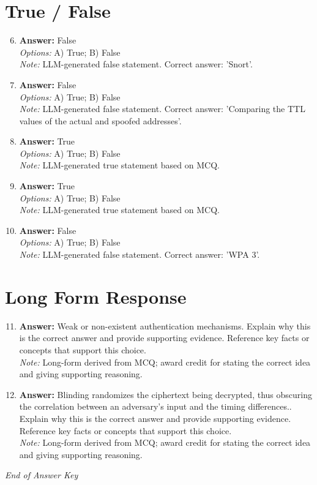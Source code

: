 \documentclass[12pt]{article}
\begin{document}
\section*{True / False}
\begin{enumerate}[label=\arabic*.]
\setcounter{enumi}{5}
\item \textbf{Answer:} False
\\ \textit{Options:} A) True; B) False
\\ \textit{Note:} LLM-generated false statement. Correct answer: 'Snort'.
\item \textbf{Answer:} False
\\ \textit{Options:} A) True; B) False
\\ \textit{Note:} LLM-generated false statement. Correct answer: 'Comparing the TTL values of the actual and spoofed addresses'.
\item \textbf{Answer:} True
\\ \textit{Options:} A) True; B) False
\\ \textit{Note:} LLM-generated true statement based on MCQ.
\item \textbf{Answer:} True
\\ \textit{Options:} A) True; B) False
\\ \textit{Note:} LLM-generated true statement based on MCQ.
\item \textbf{Answer:} False
\\ \textit{Options:} A) True; B) False
\\ \textit{Note:} LLM-generated false statement. Correct answer: 'WPA 3'.
\end{enumerate}

\section*{Long Form Response}
\begin{enumerate}[label=\arabic*.]
\setcounter{enumi}{10}
\item \textbf{Answer:} Weak or non-existent authentication mechanisms. Explain why this is the correct answer and provide supporting evidence. Reference key facts or concepts that support this choice.
\\ \textit{Note:} Long-form derived from MCQ; award credit for stating the correct idea and giving supporting reasoning.
\item \textbf{Answer:} Blinding randomizes the ciphertext being decrypted, thus obscuring the correlation between an adversary's input and the timing differences.. Explain why this is the correct answer and provide supporting evidence. Reference key facts or concepts that support this choice.
\\ \textit{Note:} Long-form derived from MCQ; award credit for stating the correct idea and giving supporting reasoning.
\end{enumerate}

\vfill
\noindent\textit{End of Answer Key}
\end{document}
